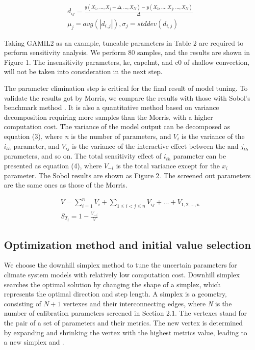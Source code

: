 \documentclass[gmd, manuscript]{copernicus}
\begin{document}
\begin{align}
& d_{ij} = \frac{y(X_1,...,X_j+\Delta,...,X_N)-y(X_1,...,X_j,...,X_N)}{\Delta} \\
& \mu_j = avg(|d_{i,j}|), \sigma_j = stddev(d_{i,j}) 
\end{align}

Taking GAMIL2 as an example, tuneable parameters in Table 2 are required to perform sensitivity analysis. We perform 80 samples, and the results are shown in Figure 1. The insensitivity parameters, ke, capelmt, and c0 of shallow convection, will not be taken into consideration in the next step.


The parameter elimination step is critical for the final result of model tuning. To validate the results got by Morris, we compare the results with those with Sobol’s benchmark method \citep{sobol2001global}. It is also a quantitative method based on variance decomposition requiring more samples than the Morris, with a higher computation cost. The variance of the model output can be decomposed as equation (3), where \textit{n} is the number of parameters, and $V_i$ is the variance of the $i_{th}$ parameter, and $V_{ij}$ is the variance of the interactive effect between the  and $j_{th}$ parameters, and so on. The total sensitivity effect of $i_{th}$ parameter can be presented as equation (4), where $V_{-i}$ is the total variance except for the $x_i$ parameter. The Sobol results are shown as Figure 2.  The screened out parameters are the same ones as those of the Morris.

\begin{align}
& V = \sum_{i=1}^n V_i + \sum_{1 \leq i < j \leq n} V_{ij} + ... + V_{1,2,...,n}  \\
& S_{T_i} = 1 - \frac{V_{-i}}{V} 
\end{align}


\subsection{Optimization method and initial value selection}

We choose the downhill simplex method to tune the uncertain parameters for climate system models with relatively low computation cost. Downhill simplex searches the optimal solution by changing the shape of a simplex, which represents the optimal direction and step length. A simplex is a geometry, consisting of $N+1$ vertexes and their interconnecting edges, where \textit{N} is the number of calibration parameters screened in Section 2.1. The vertexes stand for the pair of a set of parameters and their metrics. The new vertex is determined by expanding and shrinking the vertex with the highest metrics value, leading to a new simplex \cite{press1992numerical} and \cite{nelder1965simplex}.
\end{document}
